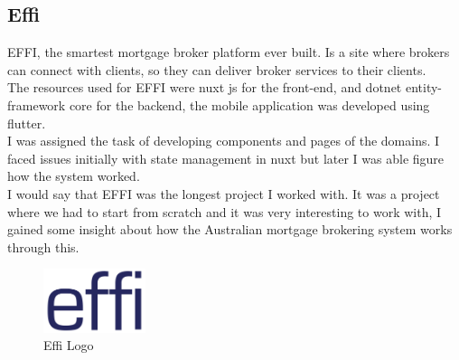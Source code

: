 \documentclass[12pt]{article}
\begin{document}
\subsection{Effi}
EFFI, the smartest mortgage broker platform ever built. Is a site where brokers can connect with clients, so they 
can deliver broker services to their clients. \\
\newline
The resources used for EFFI were nuxt js for the front-end, and dotnet entity-framework core for the backend, the 
mobile application was developed using flutter.\\
\newline
I was assigned the task of developing components and pages of the domains. I faced issues initially with state management
in nuxt but later I was able figure how the system worked.\\
\newline
I would say that EFFI was the longest project I worked with. It was a project where we had to start from scratch
and it was very interesting to work with, I gained some insight about how the Australian mortgage brokering system works
through this.

 \begin{figure}[ht]
  \includegraphics[width=3cm]{effi.png}
  \caption{Effi Logo}
  \label{fig:effi}
\end{figure}
\end{document}
